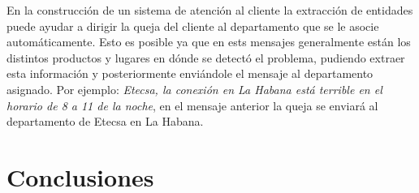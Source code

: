 \documentclass[runningheads]{llncs}
\begin{document}
En la construcción de un sistema de atención al cliente la extracción de entidades puede ayudar a dirigir la queja del cliente al departamento que se le asocie automáticamente. Esto es posible ya que en ests mensajes generalmente están los distintos productos y lugares en dónde se detectó el problema, pudiendo extraer esta información y posteriormente enviándole el mensaje al departamento asignado. Por ejemplo: \emph{Etecsa, la conexión en La Habana está terrible en el horario de 8 a 11 de la noche}, en el mensaje anterior la queja se enviará al departamento de Etecsa en La Habana.


\section{Conclusiones}

\end{document}
